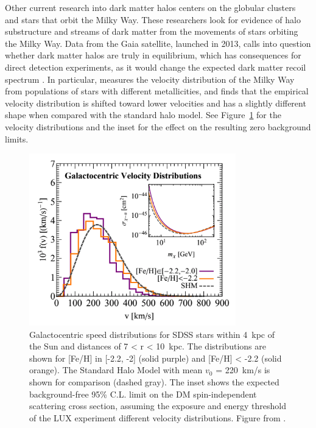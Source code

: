 Other current research into dark matter halos centers on the globular clusters and stars that orbit the Milky Way. These researchers look for evidence of halo substructure and streams of dark matter from the movements of stars orbiting the Milky Way. Data from the Gaia satellite, launched in 2013, calls into question whether dark matter halos are truly in equilibrium, which has consequences for direct detection experiments, as it would change the expected dark matter recoil spectrum \cite{Herzog-Arbeitman2018} \cite{Necib2018}. In particular, \cite{Herzog-Arbeitman2018} measures the velocity distribution of the Milky Way from populations of stars with different metallicities, and finds that the empirical velocity distribution is shifted toward lower velocities and has a slightly different shape when compared with the standard halo model. See Figure~\ref{fig:halo_model_vs_data} for the velocity distributions and the inset for the effect on the resulting zero background limits.

\begin{figure}[htbp]
\begin{center}
\includegraphics[width=0.8\textwidth]{figures/theory/halo_model_vs_data.png}
\caption{Galactocentric speed distributions for SDSS stars within 4~kpc of the Sun and distances of 7 < r < 10~kpc. The distributions are shown for [Fe/H] in [-2.2, -2] (solid purple) and [Fe/H] < -2.2 (solid orange). The Standard Halo Model with mean $v_{0}$ = 220~km/s is shown for comparison (dashed gray). The inset shows the expected background-free 95\% C.L. limit on the \acs{DM} spin-independent scattering cross section, assuming the exposure and energy threshold of the \acs{LUX} experiment different velocity distributions. Figure from \cite{Herzog-Arbeitman2018}. }
\label{fig:halo_model_vs_data}
\end{center}
\end{figure}

